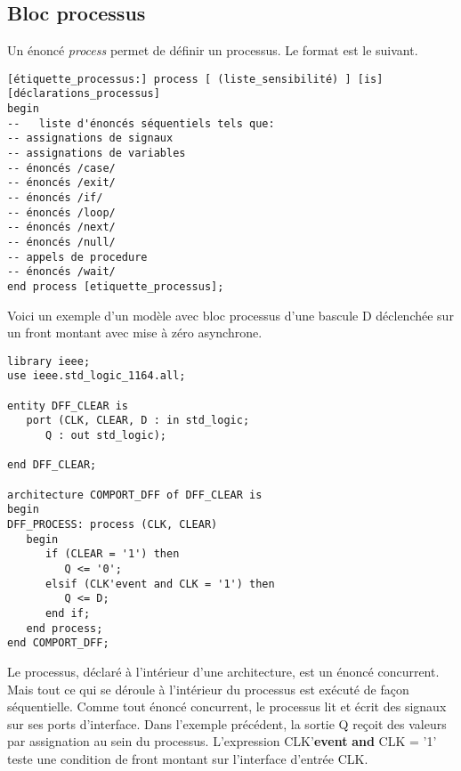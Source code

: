 \documentclass[11pt]{article}
\begin{document}
\subsection{Bloc processus}
\label{sec:org4015111}

Un énoncé \emph{process} permet de définir un processus. Le format est le
suivant.

\begin{listing}[htbp]
\begin{verbatim}
[étiquette_processus:] process [ (liste_sensibilité) ] [is]
[déclarations_processus]
begin
--   liste d'énoncés séquentiels tels que:
-- assignations de signaux 
-- assignations de variables
-- énoncés /case/
-- énoncés /exit/
-- énoncés /if/ 
-- énoncés /loop/ 
-- énoncés /next/
-- énoncés /null/
-- appels de procedure
-- énoncés /wait/
end process [etiquette_processus];
\end{verbatim}
\caption{Bloc processus}
\end{listing}

Voici un exemple d'un modèle avec bloc processus d'une bascule D
déclenchée sur un front montant avec mise à zéro asynchrone.

\begin{listing}[htbp]
\begin{verbatim}
library ieee;
use ieee.std_logic_1164.all;

entity DFF_CLEAR is
   port (CLK, CLEAR, D : in std_logic;
      Q : out std_logic);

end DFF_CLEAR;

architecture COMPORT_DFF of DFF_CLEAR is
begin
DFF_PROCESS: process (CLK, CLEAR)
   begin
      if (CLEAR = '1') then
         Q <= '0';
      elsif (CLK'event and CLK = '1') then
         Q <= D;
      end if;
   end process;
end COMPORT_DFF;
\end{verbatim}
\caption{Bascule D, front montant, mise à zéro asynchrone}
\end{listing}

Le processus, déclaré à l'intérieur d'une architecture, est un énoncé
concurrent.  Mais tout ce qui se déroule à l'intérieur du processus
est exécuté de façon séquentielle. Comme tout énoncé concurrent, le
processus lit et écrit des signaux sur ses ports d'interface. Dans
l'exemple précédent, la sortie Q reçoit des valeurs par assignation au
sein du processus. L'expression CLK'\textbf{event} \textbf{and} CLK = '1' teste une
condition de front montant sur l'interface d'entrée CLK.
\end{document}

